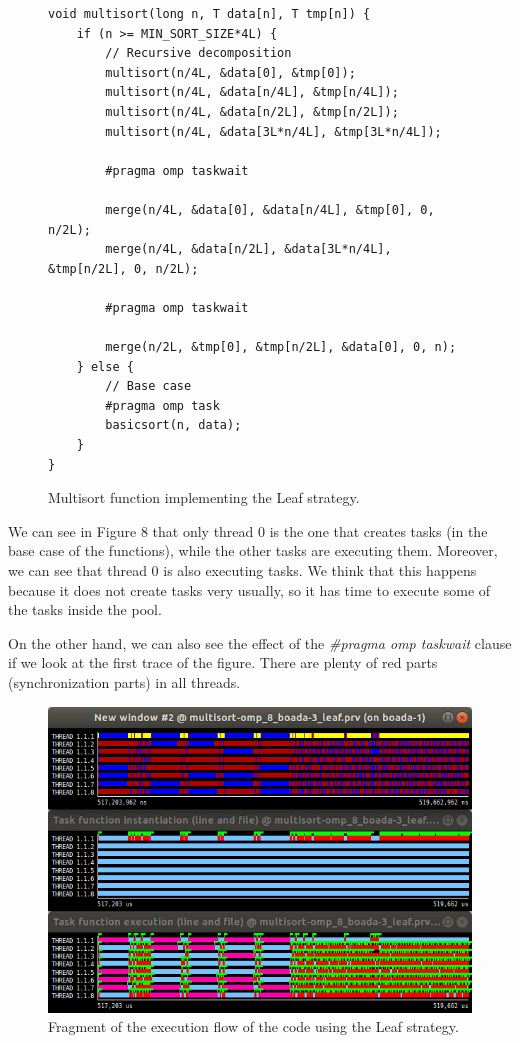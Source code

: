 \documentclass[12pt, a4paper]{article}
\begin{document}
\begin{figure}[H]
\begin{lstlisting}
void multisort(long n, T data[n], T tmp[n]) {
    if (n >= MIN_SORT_SIZE*4L) {
        // Recursive decomposition
		multisort(n/4L, &data[0], &tmp[0]);
		multisort(n/4L, &data[n/4L], &tmp[n/4L]);
		multisort(n/4L, &data[n/2L], &tmp[n/2L]);
		multisort(n/4L, &data[3L*n/4L], &tmp[3L*n/4L]);
		
		#pragma omp taskwait
		
		merge(n/4L, &data[0], &data[n/4L], &tmp[0], 0, n/2L);
		merge(n/4L, &data[n/2L], &data[3L*n/4L], &tmp[n/2L], 0, n/2L);
		
		#pragma omp taskwait
		
        merge(n/2L, &tmp[0], &tmp[n/2L], &data[0], 0, n);
	} else {
		// Base case
		#pragma omp task
		basicsort(n, data);
	}
}
\end{lstlisting}

\caption{Multisort function implementing the Leaf strategy.}
\end{figure}

We can see in Figure 8 that only thread 0 is the one that creates tasks (in the base case of the functions), while the other tasks are executing them. Moreover, we can see that thread 0 is also executing tasks. We think that this happens because it does not create tasks very usually, so it has time to execute some of the tasks inside the pool.

On the other hand, we can also see the effect of the \textit{\#pragma omp taskwait} clause if we look at the first trace of the figure. There are plenty of red parts (synchronization parts) in all threads.

\begin{figure}[H]
	\centering
	\includegraphics[scale=0.45]{./images/S2/Leaf_paraver}
	
	\label{fig:leaf_traces}
	\caption{Fragment of the execution flow of the code using the Leaf strategy.}
\end{figure}
\end{document}
